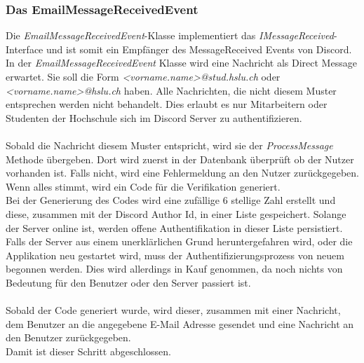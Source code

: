 \documentclass[a4paper, table]{article}
\begin{document}
\subsubsection*{Das EmailMessageReceivedEvent}
Die \textit{EmailMessageReceivedEvent}-Klasse implementiert das \textit{IMessageReceived}-Interface 
und ist somit ein Empfänger des MessageReceived Events von Discord.
In der \textit{EmailMessageReceivedEvent} Klasse wird eine Nachricht als Direct Message erwartet. 
Sie soll die Form \textit{<vorname.name>@stud.hslu.ch} oder \textit{<vorname.name>@hslu.ch} haben. 
Alle Nachrichten, die nicht diesem Muster entsprechen werden nicht behandelt. 
Dies erlaubt es nur Mitarbeitern oder Studenten der Hochschule sich im Discord Server zu authentifizieren.\\\\
Sobald die Nachricht diesem Muster entspricht, wird sie der \textit{ProcessMessage} Methode übergeben. 
Dort wird zuerst in der Datenbank überprüft ob der Nutzer vorhanden ist. 
Falls nicht, wird eine Fehlermeldung an den Nutzer zurückgegeben. 
Wenn alles stimmt, wird ein Code für die Verifikation generiert.\\ 
Bei der Generierung des Codes wird eine zufällige 6 stellige Zahl erstellt und diese, zusammen mit der Discord Author Id, in einer Liste gespeichert. 
Solange der Server online ist, werden offene Authentifikation in dieser Liste persistiert. 
Falls der Server aus einem unerklärlichen Grund heruntergefahren wird, oder die Applikation neu gestartet wird, 
muss der Authentifizierungsprozess von neuem begonnen werden.
Dies wird allerdings in Kauf genommen, da noch nichts von Bedeutung für den Benutzer oder den Server passiert ist.\\\\
Sobald der Code generiert wurde, wird dieser, zusammen mit einer Nachricht, dem Benutzer an die angegebene E-Mail Adresse gesendet 
und eine Nachricht an den Benutzer zurückgegeben.\\
Damit ist dieser Schritt abgeschlossen.
\end{document}
